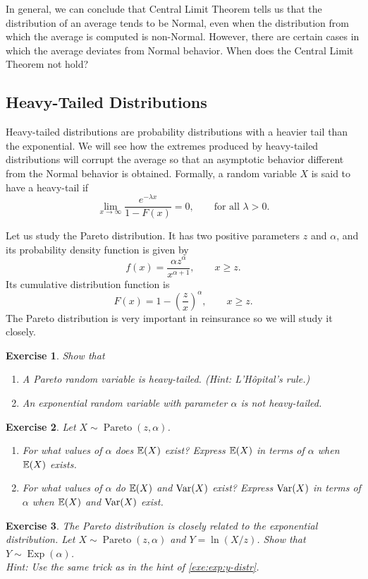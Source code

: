 \documentclass[12pt]{article}
\DeclareMathOperator{\Exp}{Exp}
\DeclareMathOperator{\Pareto}{Pareto}
\newtheorem{exercise}{Exercise}[section]
\begin{document}
In general, we can conclude that Central Limit Theorem tells us that the distribution of
an average tends to be Normal, even when the distribution from which the average is computed is non-Normal.
However, there are certain cases in which the average deviates from Normal behavior.
When does the Central Limit Theorem not hold?

\subsection{Heavy-Tailed Distributions}

Heavy-tailed distributions are probability distributions with a heavier tail than the exponential.
We will see how the extremes produced by heavy-tailed distributions will corrupt the average
so that an asymptotic behavior different from the Normal behavior is obtained.
Formally, a random variable $X$ is said to have a heavy-tail if
\[ \lim_{x \to \infty} \frac{e^{-\lambda x}}{1 - F(x)} = 0, \qquad \text{for all } \lambda > 0. \]

Let us study the Pareto distribution. It has two positive parameters $z$ and $\alpha$,
and its probability density function is given by
\[ f(x) = \frac{\alpha z^{\alpha}}{x^{\alpha + 1}}, \qquad x \ge z. \]
Its cumulative distribution function is
\[ F(x) = 1 - \left(\frac{z}{x}\right)^{\alpha}, \qquad x \ge z. \]
The Pareto distribution is very important in reinsurance so we will study it closely.

\begin{tcolorbox}[mathExe]
\begin{exercise}
\label{exe:par:ht}
Show that
\begin{enumerate}[label=(\alph*)]
\item A Pareto random variable is heavy-tailed. \;
    \textcolor{mathExeSec}{(Hint: L'H\^opital's rule.)}
\item An exponential random variable with parameter $\alpha$ is not heavy-tailed.
\end{enumerate}
\end{exercise}

\begin{exercise}
\label{exe:par:ev}
Let $X \sim \Pareto(z, \alpha)$.
\begin{enumerate}[label=(\alph*)]
\item For what values of $\alpha$ does $\operatorname*{\mathbb{E}}(X)$ exist?
    Express $\operatorname*{\mathbb{E}}(X)$ in terms of $\alpha$ when $\operatorname*{\mathbb{E}}(X)$ exists.
\item For what values of $\alpha$ do $\operatorname*{\mathbb{E}}(X)$ and $\operatorname*{Var}(X)$ exist?
    Express $\operatorname*{Var}(X)$ in terms of $\alpha$ when $\operatorname*{\mathbb{E}}(X)$ and $\operatorname*{Var}(X)$ exist.
\end{enumerate}
\end{exercise}

\begin{exercise}
\label{exe:pareto-vs-exp}
The Pareto distribution is closely related to the exponential distribution.
Let $X \sim \Pareto(z, \alpha)$ and $Y = \ln(X/z)$.
Show that $Y \sim \Exp(\alpha)$.
\\ \textcolor{mathExeSec}{Hint: Use the same trick as in the hint of \cref{exe:exp:y-distr}.}
\end{exercise}
\end{tcolorbox}
\end{document}
